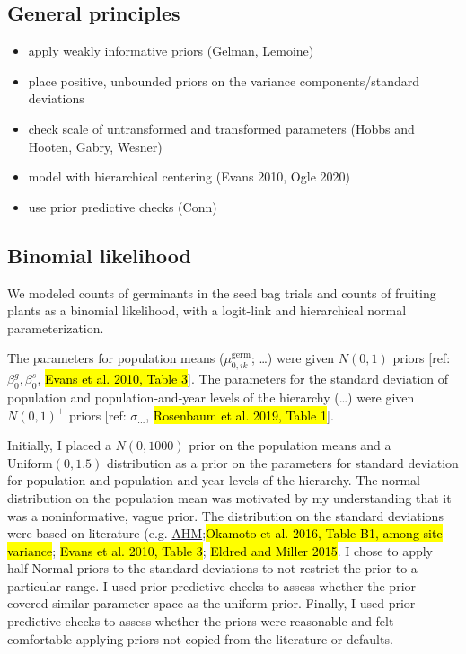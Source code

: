 \documentclass[12pt, oneside, titlepage]{article}   	%
\begin{document}
\subsection*{General principles}

\begin{itemize}
\item apply weakly informative priors (Gelman, Lemoine)
\item place positive, unbounded priors on the variance components/standard deviations
\item check scale of untransformed and transformed parameters (Hobbs and Hooten, Gabry, Wesner)
\item model with hierarchical centering (Evans 2010, Ogle 2020)
\item use prior predictive checks (Conn)
\end{itemize}

\subsection*{Binomial likelihood}

We modeled counts of germinants in the seed bag trials and counts of fruiting plants as a binomial likelihood, with a logit-link and hierarchical normal parameterization. 

The parameters for population means ($\mu_{0,ik}^\mathrm{germ}$; \dots) were given $N(0,1)$ priors [ref: $\beta_0^g, \beta_0^s$, \hl{Evans et al. 2010, Table 3}]. The parameters for the standard deviation of population and population-and-year levels of the hierarchy (\dots) were given $N(0,1)^+$ priors [ref: $\sigma_{\dots}$, \hl{Rosenbaum et al. 2019, Table 1}]. 

Initially, I placed a $N(0,1000)$ prior on the population means and a $\mathrm{Uniform}(0,1.5)$ distribution as a prior on the parameters for standard deviation for population and population-and-year levels of the hierarchy. The normal distribution on the population mean was motivated by my understanding that it was a noninformative, vague prior. The distribution on the standard deviations were based on literature (e.g.  \href{www.mbr-pwrc.usgs.gov/pubanalysis/keryroylebook/R_BUGS_code_AHM_Vol_1_20170519.R}{AHM};\hl{Okamoto et al. 2016, Table B1, among-site variance}; \hl{Evans et al. 2010, Table 3}; \hl{Eldred and Miller 2015}. I chose to apply half-Normal priors to the standard deviations to not restrict the prior to a particular range. I used prior predictive checks to assess whether the prior covered similar parameter space as the uniform prior. Finally, I used prior predictive checks to assess whether the priors were reasonable and felt comfortable applying priors not copied from the literature or defaults. 
\end{document}
